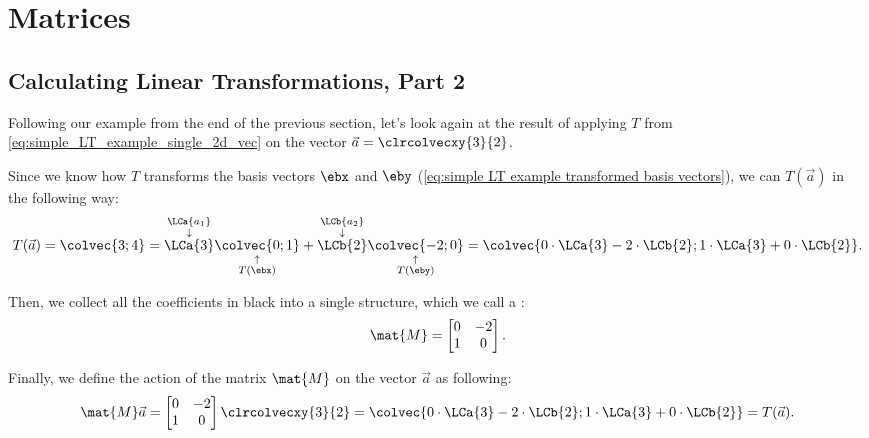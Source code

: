 \section{Matrices}
\subsection{Calculating Linear Transformations, Part 2}
Following our example from the end of the previous section, let's look again at the result of applying $T$ from \autoref{eq:simple_LT_example_single_2d_vec} on the vector $\vec{a}=\clrcolvecxy{3}{2}$.

Since we know how $T$ transforms the basis vectors $\ebx$ and $\eby$ (\autoref{eq:simple LT example transformed basis vectors}), we can $T(\vec{a})$ in the following way:
\begin{equation}
	T(\vec{a}) = \colvec{3;4} = \overset{\substack{\LCa{a_{1}} \\ \downarrow}}{\LCa{3}}\underset{\substack{\uparrow \\ T(\ebx)}}{\colvec{0;1}} + \overset{\substack{\LCb{a_{2}} \\ \downarrow}}{\LCb{2}}\underset{\substack{\uparrow \\ T(\eby)}}{\colvec{-2;0}} = \colvec{0\cdot\LCa{3}-2\cdot\LCb{2};1\cdot\LCa{3}+0\cdot\LCb{2}}.
	\label{eq:developing matrix notation step 1}
\end{equation}

Then, we collect all the coefficients in black into a single structure, which we call a :
\begin{equation}
	\mat{M} =
	\begin{bmatrix}
		0 & -2 \\
		1 & 0
	\end{bmatrix}.
	\label{eq:developing matrix notation step 2}
\end{equation}

Finally, we define the action of the matrix $\mat{M}$ on the vector $\vec{a}$ as following:
\begin{equation}
	\mat{M}\vec{a} =
	\begin{bmatrix}
		0 & -2 \\
		1 & 0
	\end{bmatrix}\clrcolvecxy{3}{2} = \colvec{0\cdot\LCa{3}-2\cdot\LCb{2};1\cdot\LCa{3}+0\cdot\LCb{2}} = T(\vec{a}).
	\label{eq:developing matrix notation step 3}
\end{equation}

